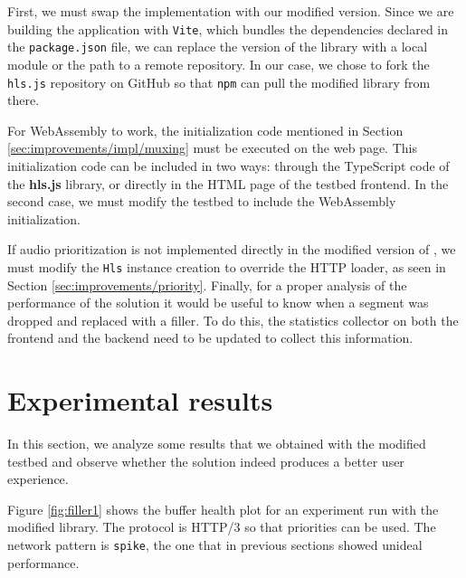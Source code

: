 First, we must swap the \hlsjs{} implementation with our modified version. Since we are building the application with \texttt{Vite}, which bundles the dependencies declared in the \texttt{package.json} file, we can replace the version of the \hlsjs{} library with a local module or the path to a remote repository. In our case, we chose to fork the \texttt{hls.js} repository on GitHub so that \texttt{npm} can pull the modified library from there.

For WebAssembly to work, the initialization code mentioned in Section \ref{sec:improvements/impl/muxing} must be executed on the web page. This initialization code can be included in two ways: through the TypeScript code of the \textbf{hls.js} library, or directly in the HTML page of the testbed frontend. In the second case, we must modify the testbed to include the WebAssembly initialization.

If audio prioritization is not implemented directly in the modified version of \hlsjs{}, we must modify the \texttt{Hls} instance creation to override the HTTP loader, as seen in Section \ref{sec:improvements/priority}. Finally, for a proper analysis of the performance of the solution it would be useful to know when a segment was dropped and replaced with a filler. To do this, the statistics collector on both the frontend and the backend need to be updated to collect this information.

\section{Experimental results}
\label{sec:improvements/results}

In this section, we analyze some results that we obtained with the modified testbed and observe whether the solution indeed produces a better user experience.

Figure \ref{fig:filler1} shows the buffer health plot for an experiment run with the modified \hlsjs{} library. The protocol is HTTP/3 so that priorities can be used. The network pattern is \texttt{spike}, the one that in previous sections showed unideal performance.

